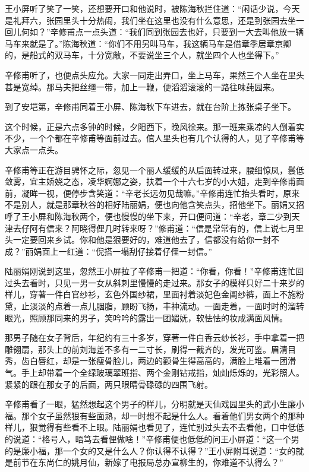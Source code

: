 \documentclass[12pt,UTF8]{ctexbook}
\begin{document}
{{{王小屏听了笑了一笑，还想要开口和他说时，被陈海秋拦住道：“闲话少说，今天是礼拜六，张园里头十分热闹，我们坐在这里也没有什么意思，还是到张园去坐一回儿何如？”辛修甫点一点头道：“我们同到张园去也好，只要到一大去叫他放一辆马车来就是了。”陈海秋道：“你们不用另叫马车，我这辆马车是借章季居章京卿的，是船式的双马车，十分宽敞，不要说坐三个人，就坐四个人也坐得下。”

辛修甫听了，也便点头应允。大家一同走出弄口，坐上马车，果然三个人坐在里头甚是宽绰。那马夫把丝缰一带，加上一鞭，便滔滔滚滚的一路往味莼园来。

到了安垲第，辛修甫同着王小屏、陈海秋下车进去，就在台阶上拣张桌子坐下。

这个时候，正是六点多钟的时候，夕阳西下，晚风徐来。那一班来乘凉的人倒着实不少，一个个都在辛修甫等面前过去。倌人里头也有几个认得的人，见了辛修甫等大家点一点头。

辛修甫等正在游目骋怀之际，忽见一个丽人缓缓的从后面转过来，腰细惊凤，鬟低敛雾，宜主娇娆之态，凌华婀娜之姿，扶着一个十六七岁的小大姐，走到辛修甫面前，凝眸一视，便停步含笑道：“辛老长远勿见哉嘛。”辛修甫连忙抬头看时，原来不是别人，就是那章秋谷的相好陆丽娟，便也向他含笑点头，招他坐下。丽娟又招呼了王小屏和陈海秋两个，便也慢慢的坐下来，开口便问道：“辛老，章二少到天津去仔阿有信来？阿晓得俚几时转来呀？”修甫道：“信是常常有的，信上说七月里头一定要回来乡试。你和他是狠要好的，难道他去了，信都没有给你一封不成？”丽娟面上一红道：“倪搭一塌刮仔接着仔俚一封信。”

陆丽娟刚说到这里，忽然王小屏拉了辛修甫一把道：“你看，你看！”辛修甫连忙回过头去看时，只见一男一女从斜刺里慢慢的走过来。那女子的模样只好二十来岁的样儿，穿著一件白官纱衫，玄色外国纱裙，里面衬着淡妃色金阊纱裤，面上不施粉黛，止淡淡的点着一点儿胭脂，顾盼飞扬，丰神流动。一面走着，一面时时的溜转眼光，照顾那同来的男子，笑吟吟的露出一团媚妩，软怯怯的妆成满面风情。

那男子随在女子背后，年纪约有三十多岁，穿著一件白香云纱长衫，手中拿着一把雕翎扇，那头上的前刘海差不多有一二寸长，刷得一截齐的，发光可鉴。眉清目秀，齿白唇红，却是一张瘦骨脸儿，两边的颧骨生得高高的，满脸上堆着一团滑气。手上却带着一个全绿玻璃翠班指、两个金刚钻戒指，灿灿烁烁的，光彩照人。紧紧的跟在那女子的后面，两只眼睛骨碌碌的四围飞射。

辛修甫看了一眼，猛然想起这个男子的样儿，分明就是天仙戏园里头的武小生廉小福。那个女子虽然狠有些面熟，却一时想不起是什么人。看着他们男女两个的那种样儿，狠觉得有些看不上眼。陆丽娟也看见了，连忙别过头去不去看他，口中低低的说道：“格号人，晤笃去看俚做啥！”辛修甫便也低低的问王小屏道：“这一个男的是廉小福，那一个女的又是什么人？你认得不认得？”王小屏附耳说道：“女的就是前节在东尚仁的姚月仙，新嫁了电报局总办宣柳生的，你难道不认得么？”

}}}
\end{document}
